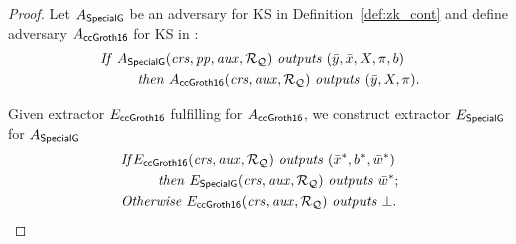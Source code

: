 \begin{proof}
\noindent Let $A_{{\mathsf{SpecialG}}}$ be an adversary for KS in Definition~\ref{def:zk_cont} and 
define adversary $A_{{\mathsf{ccGroth16}}}$ for KS  in :
\begin{align*}
&\mathit{If} \ A_{\SpecialG} (\crs, \pp, \realaux, \relRQ)\ \mathit{outputs} \  (\bary, \barx, X, \pi, b) \\
&\ \ \ \ \ \ \ \ \mathit{then}\ A_{\ccgroth} (\crs, \realaux, \relRQ)\ \mathit{outputs} \ (\bary, X, \pi). 
\end{align*}

\noindent Given extractor $E_{{\mathsf{ccGroth16}}}$ fulfilling  for $A_{{\mathsf{ccGroth16}}}$, we
construct extractor $E_{{\mathsf{SpecialG}}}$ for $A_{{\mathsf{SpecialG}}}$
\begin{align*}
&\mathit{If} E_{\ccgroth} (\crs, \realaux, \relRQ)\ \mathit{outputs} \ (\barx^*, b^*, \baromega^*) \\
& \ \ \ \ \ \ \ \ \mathit{then} \ E_{\SpecialG} (\crs, \realaux, \relRQ) \ \mathit{outputs} \ \baromega^*; \\
& \mathit{Otherwise} \ E_{\ccgroth}(\crs, \realaux, \relRQ) \ \mathit{outputs} \ \bot.
\end{align*}


\end{proof}
